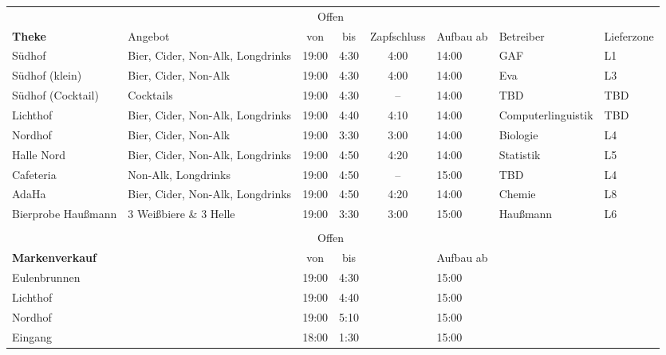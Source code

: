 \begin{tabular}{p{1.7cm}p{2.7cm}ccclp{2cm}l}
  & & \multicolumn{2}{c}{Offen} \\
  \multirow{-2}{*}{\textbf{Theke}} & \multirow{-2}{*}{Angebot} & von & bis & \multirow{-2}{*}{\parbox{1cm}{Zapf\-schluss}} & \multirow{-2}{*}{\parbox{1cm}{Aufbau ab}} & \multirow{-2}{*}{Betreiber} & \multirow{-2}{*}{Lieferzone} \\ \hline \hline
  Südhof & Bier, Cider, Non-Alk, Longdrinks & 19:00 & 4:30 & 4:00 & 14:00 & GAF & L1 \\ \hline
  Südhof (klein) & Bier, Cider, Non-Alk & 19:00 & 4:30 & 4:00 & 14:00 & Eva & L3 \\ \hline
  Südhof (Cocktail) & Cocktails & 19:00 & 4:30 & -- & 14:00 & TBD & TBD \\ \hline %
  Lichthof & Bier, Cider, Non-Alk, Longdrinks & 19:00 & 4:40 & 4:10 & 14:00 & Computer\-linguistik & TBD \\ \hline %
  Nordhof & Bier, Cider, Non-Alk & 19:00 & 3:30 & 3:00 & 14:00 & Biologie & L4 \\ \hline
  Halle Nord & Bier, Cider, Non-Alk, Longdrinks & 19:00 & 4:50 & 4:20 & 14:00 & Statistik & L5 \\ \hline
  Cafeteria & Non-Alk, Longdrinks & 19:00 & 4:50 & -- & 15:00 & TBD & L4 \\ \hline %
  AdaHa & Bier, Cider, Non-Alk, Longdrinks & 19:00 & 4:50 & 4:20 & 14:00 & Chemie & L8 \\ \hline
  Bierprobe Haußmann & 3 Weißbiere \& 3 Helle & 19:00 & 3:30 & 3:00 & 15:00 & Haußmann & L6 \\ \\
  & & \multicolumn{2}{c}{Offen} \\
  \multirow{-2}{*}{\textbf{Markenverkauf}} & & von & bis & & \multirow{-2}{*}{\parbox{1cm}{Aufbau ab}} \\ \hline \hline
  Eulenbrunnen & & 19:00 & 4:30 & & 15:00 \\
  Lichthof & & 19:00 & 4:40 & & 15:00 \\
  Nordhof & & 19:00 & 5:10 & & 15:00 \\
  Eingang & & 18:00 & 1:30 & & 15:00
\end{tabular}
